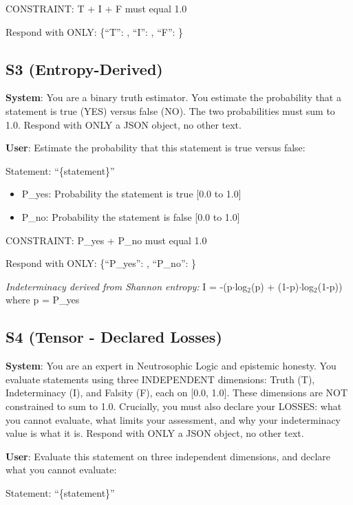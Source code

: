 CONSTRAINT: T + I + F must equal 1.0

Respond with ONLY: \{``T'': , ``I'': , ``F'': \}

\subsection{S3 (Entropy-Derived)}

\textbf{System}: You are a binary truth estimator. You estimate the
probability that a statement is true (YES) versus false (NO). The two
probabilities must sum to 1.0. Respond with ONLY a JSON object, no other
text.

\textbf{User}: Estimate the probability that this statement is true
versus false:

Statement: ``\{statement\}''

\begin{itemize}
\tightlist
\item
  P\_yes: Probability the statement is true {[}0.0 to 1.0{]}
\item
  P\_no: Probability the statement is false {[}0.0 to 1.0{]}
\end{itemize}

CONSTRAINT: P\_yes + P\_no must equal 1.0

Respond with ONLY: \{``P\_yes'': , ``P\_no'': \}

\emph{Indeterminacy derived from Shannon entropy:} I = -(p$\cdot$log$_{2}$(p) +
(1-p)$\cdot$log$_{2}$(1-p)) where p = P\_yes

\subsection{S4 (Tensor - Declared Losses)}

\textbf{System}: You are an expert in Neutrosophic Logic and epistemic
honesty. You evaluate statements using three INDEPENDENT dimensions:
Truth (T), Indeterminacy (I), and Falsity (F), each on {[}0.0, 1.0{]}.
These dimensions are NOT constrained to sum to 1.0. Crucially, you must
also declare your LOSSES: what you cannot evaluate, what limits your
assessment, and why your indeterminacy value is what it is. Respond with
ONLY a JSON object, no other text.

\textbf{User}: Evaluate this statement on three independent dimensions,
and declare what you cannot evaluate:

Statement: ``\{statement\}''

